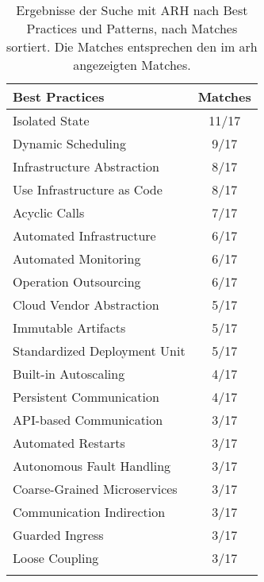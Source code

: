 \begin{table}[!htb]
\begin{minipage}{.5\linewidth}
    \centering
    \begin{tabular}{p{5cm} c}
      \toprule
      \textbf{Best Practices} & \textbf{Matches} \\ \midrule
      Isolated State                        & 11/17 \\ \hline
      Dynamic Scheduling                    & 9/17 \\ \hline
      Infrastructure Abstraction            & 8/17 \\ \hline
      Use Infrastructure as Code            & 8/17 \\ \hline
      Acyclic Calls                         & 7/17 \\ \hline
      Automated Infrastructure              & 6/17 \\ \hline
      Automated Monitoring                  & 6/17 \\ \hline
      Operation Outsourcing                 & 6/17 \\ \hline
      Cloud Vendor Abstraction              & 5/17 \\ \hline
      Immutable Artifacts                   & 5/17 \\ \hline
      Standardized Deployment Unit          & 5/17 \\ \hline
      Built-in Autoscaling                  & 4/17 \\ \hline
      Persistent Communication              & 4/17 \\ \hline
      API-based Communication               & 3/17 \\ \hline
      Automated Restarts                    & 3/17 \\ \hline
      Autonomous Fault Handling             & 3/17 \\ \hline
      Coarse-Grained Microservices          & 3/17 \\ \hline
      Communication Indirection             & 3/17 \\ \hline
      Guarded Ingress                       & 3/17 \\ \hline
      Loose Coupling                        & 3/17 \\ \bottomrule
      \\
    \end{tabular}
  \end{minipage}

  \caption[Ergebnisse der Suche mit ARH nach Best Practices und Patterns]{
		Ergebnisse der Suche mit ARH nach Best Practices und Patterns, nach Matches sortiert.
		Die Matches entsprechen den im \gls{arh} angezeigten Matches.
	}
	\label{tab:phase3-search-results}
\end{table}
